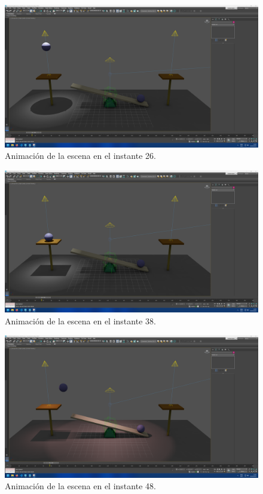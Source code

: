 \documentclass{article}
\begin{document}
 \begin{figure}[H]
    \centering
    \includegraphics[width=\textwidth]{imagenes/animaciones/general/26.png}
    \caption{Animación de la escena en el instante 26.}
 \end{figure}

 \begin{figure}[H]
    \centering
    \includegraphics[width=\textwidth]{imagenes/animaciones/general/38.png}
    \caption{Animación de la escena en el instante 38.}
 \end{figure}

 \begin{figure}[H]
    \centering
    \includegraphics[width=\textwidth]{imagenes/animaciones/general/48.png}
    \caption{Animación de la escena en el instante 48.}
 \end{figure}
\end{document}
